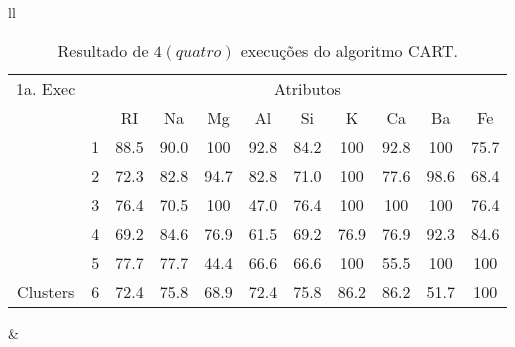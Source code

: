 


\begin{table}[!ht]
\caption{Resultado de ${4(quatro)}$ execuções do algoritmo CART.}
 \begin{tabular}{ll}

  
   \small\addtolength{\tabcolsep}{-5pt}
    \begin{tabular}{|cl|c|c|c|c|c|c|c|c|c|}
        \hline \hline
            {\tiny 1a. Exec}     &   & \multicolumn{9}{c|}{\tiny Atributos}                                               \\ \cline{3-11} 
       \multicolumn{1}{|l}{}                            &   & RI    & Na    & Mg  & Al   & Si   & K   & Ca   & Ba  & Fe             \\ \hline
        \multicolumn{1}{|c|}{}                           & 1 & 88.5 & 90.0  & 100 & 92.8 & 84.2 & 100 & 92.8 & 100 & 75.7 \\ \cline{2-11} 
        \multicolumn{1}{|c|}{}                           & 2 & 72.3 & 82.8  & 94.7 & 82.8 & 71.0 & 100  & 77.6 &98.6 & 68.4  \\ \cline{2-11} 
        \multicolumn{1}{|c|}{}                           & 3 & 76.4   & 70.5& 100  & 47.0 & 76.4 & 100  & 100 & 100 & 76.4  \\ \cline{2-11}
        \multicolumn{1}{|c|}{}                           & 4 & 69.2   & 84.6& 76.9  & 61.5 & 69.2 & 76.9  & 76.9 & 92.3 & 84.6  \\ \cline{2-11}
        \multicolumn{1}{|c|}{}                           & 5 & 77.7   & 77.7& 44.4  & 66.6 & 66.6 & 100  & 55.5 & 100 & 100  \\ \cline{2-11}
        \multicolumn{1}{|c|}{\multirow{-3}{*}{\tiny Clusters}} & 6 & 72.4 & 75.8& 68.9  & 72.4 & 75.8 & 86.2  & 86.2 & 51.7 & 100   \\ 
        
        \hline
      \end{tabular}
 &
 

\end{tabular}
\end{table}
